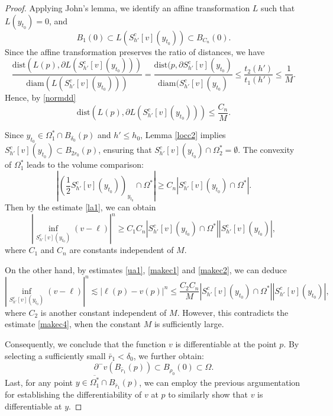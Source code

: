 \documentclass[10pt,a4paper]{amsart}
\theoremstyle{plain}
\newcommand{\0}{\textbf{0}}
\numberwithin{equation}{section}
\numberwithin{equation}{section}
\numberwithin{figure}{section}
\begin{document}
\begin{proof}
Applying John's lemma, we identify an affine transformation \(L\) such that \(L(y_{t_0}) = 0\), and 
\begin{equation}\label{normdd}
B_1(0) \subset L\left(S^c_{h'}[v](y_{t_0})\right) \subset B_{C_n}(0).
\end{equation}
Since the affine transformation preserves the ratio of distances, we have
	\[ \frac{\text{dist}\left(L(p), \partial L\left(S^c_{h'}[v](y_{t_0})\right)\right) }{\text{diam}(L\left(S^c_{h'}[v](y_{t_0})\right))} = \frac{\text{dist}(p,\partial S^c_{h'}[v](y_{t_0})}{\text{diam}(S^c_{h'}[v](y_{t_0})} \leq \frac{t_2(h')}{t_1(h')} \leq \frac{1}{M}.\]
Hence, by \eqref{normdd}
\begin{equation}\label{makec2}
\text{dist}\left(L(p), \partial L\left(S^c_{h'}[v](y_{t_0})\right)\right)   \leq \frac{C_n}{M}.
\end{equation}

Since \(y_{t_0} \in \Omega_1^* \cap B_{\delta_0}(p)\) and \(h' \leq h_0\), Lemma \ref{locc2} implies \(S^c_{h'}[v](y_{t_0}) \subset B_{2r_0}(p)\), ensuring that \(S^c_{h'}[v](y_{t_0}) \cap \Omega_2^* = \emptyset\). 
The convexity of $\Omega^*_1$ leads to the volume comparison:
\begin{equation}\label{makec3}
\left| \left(\frac{1}{2}S^c_{h'}[v](y_{t_0})\right)_{y_{t_0}} \cap \Omega^* \right| \geq C_n \left| S^c_{h'}[v](y_{t_0}) \cap \Omega^* \right|.
\end{equation}
Then by the estimate \eqref{la1}, we can obtain
\begin{equation}\label{makec4}
 \left|\inf_{S^c_{h'}[v](y_{t_0})} (v-\ell)\right|^n \geq C_1 C_n |S^c_{h'}[v](y_{t_0}) \cap \Omega^*| |S^c_{h'}[v](y_{t_0})|,
\end{equation}
where \(C_1\) and \(C_n\) are constants independent of \( M \).

On the other hand, by estimates \eqref{ua1}, \eqref{makec1} and \eqref{makec2}, we can deduce
\begin{equation}
 \left|\inf_{S^c_{h'}[v](y_{t_0})} (v-\ell)\right|^n \lesssim |\ell(p)-v(p)|^n \leq \frac{C_2 C_n}{M} |S^c_{h'}[v](y_{t_0}) \cap \Omega^*| |S^c_{h'}[v](y_{t_0})|,
\end{equation}
where \(C_2\) is another constant  independent of \( M \).
However, this contradicts the estimate \eqref{makec4}, when the constant \(M\) is sufficiently large. 

Consequently, we conclude that the function \(v\) is differentiable at the point \(p\). By selecting a sufficiently small \(\bar r_1 < \delta_0\), we further obtain:
\begin{equation}\label{newextend1}
\partial^{-}v(B_{\bar r_1}(p)) \subset B_{\rho_0}(0) \subset \Omega.
\end{equation}
Last, for any point \(y \in \overline{\Omega_1^*} \cap B_{\bar r_1}(p)\), we can employ the previous argumentation for establishing the differentiability of \(v\) at \(p\) to similarly show that \(v\) is differentiable at \(y\).
\end{proof}
\end{document}
